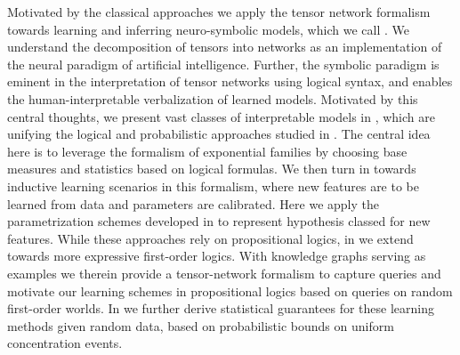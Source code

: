 Motivated by the classical approaches we apply the tensor network formalism towards learning and inferring neuro-symbolic models, which we call \HybridLogicNetworks{}.
We understand the decomposition of tensors into networks as an implementation of the neural paradigm of artificial intelligence.
Further, the symbolic paradigm is eminent in the interpretation of tensor networks using logical syntax, and enables the human-interpretable verbalization of learned models.
Motivated by this central thoughts, we present vast classes of interpretable models in , which are unifying the logical and probabilistic approaches studied in .
The central idea here is to leverage the formalism of exponential families by choosing base measures and statistics based on logical formulas.
We then turn in  towards inductive learning scenarios in this formalism, where new features are to be learned from data and parameters are calibrated.
Here we apply the parametrization schemes developed in  to represent hypothesis classed for new features.
While these approaches rely on propositional logics, in  we extend towards more expressive first-order logics.
With knowledge graphs serving as examples we therein provide a tensor-network formalism to capture queries and motivate our learning schemes in propositional logics based on queries on random first-order worlds.
In  we further derive statistical guarantees for these learning methods given random data, based on probabilistic bounds on uniform concentration events.

